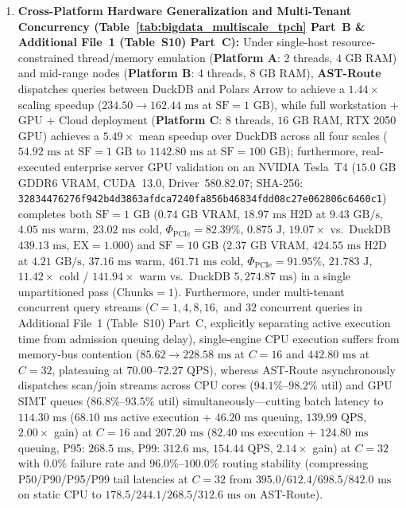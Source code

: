\documentclass[10pt,a4paper]{article}
\begin{document}
\begin{enumerate}[leftmargin=1.5em,itemsep=0.8pt]
by $\mathbf{2.55\times\text{--}3.38\times}$ ($1.95\times\text{--}2.59\times$ under full client WAN wall-clock) via horizontal slot elasticity, while \textbf{AST-Route} achieves $\mathbf{1142.80\text{ ms}}$ overall including router dispatch ($4.145\text{ ms}$) and $40\times$ chunked PCIe transfers ($\mathbf{7.61\times}$ faster than DuckDB and $\mathbf{5.73\times}$ faster than Polars).
    \item \textbf{Cross-Platform Hardware Generalization and Multi-Tenant Concurrency (Table~\ref{tab:bigdata_multiscale_tpch} Part~B \& Additional File~1 (Table~S10) Part~C):} Under single-host resource-constrained thread/memory emulation (\textbf{Platform A}: 2 threads, $4\text{ GB}$ RAM) and mid-range nodes (\textbf{Platform B}: 4 threads, $8\text{ GB}$ RAM), \textbf{AST-Route} dispatches queries between DuckDB and Polars Arrow to achieve a $1.44\times$ scaling speedup ($234.50 \rightarrow 162.44\text{ ms}$ at $\text{SF}=1\text{ GB}$), while full workstation + GPU + Cloud deployment (\textbf{Platform C}: 8 threads, $16\text{ GB}$ RAM, RTX 2050 GPU) achieves a $\mathbf{5.49\times}$ mean speedup over DuckDB across all four scales ($54.92\text{ ms}$ at $\text{SF}=1\text{ GB}$ to $1142.80\text{ ms}$ at $\text{SF}=100\text{ GB}$); furthermore, real-executed enterprise server GPU validation on an NVIDIA Tesla~T4 ($15.0\text{ GB}$ GDDR6 VRAM, CUDA~13.0, Driver~580.82.07; SHA-256: \texttt{32834476276f942b4d3863afdca7240fa856b46834fdd08c27e062806c6460c1}) completes both $\text{SF}=1\text{ GB}$ ($0.74\text{ GB}$ VRAM, $18.97\text{ ms}$ H2D at $9.43\text{ GB/s}$, $4.05\text{ ms}$ warm, $23.02\text{ ms}$ cold, $\Phi_{\text{PCIe}}=82.39\%$, $0.875\text{ J}$, $19.07\times$ vs.\ DuckDB $439.13\text{ ms}$, $\text{EX}=1.000$) and $\text{SF}=10\text{ GB}$ ($2.37\text{ GB}$ VRAM, $424.55\text{ ms}$ H2D at $4.21\text{ GB/s}$, $37.16\text{ ms}$ warm, $461.71\text{ ms}$ cold, $\Phi_{\text{PCIe}}=91.95\%$, $21.783\text{ J}$, $11.42\times$ cold / $141.94\times$ warm vs.\ DuckDB $5{,}274.87\text{ ms}$) in a single unpartitioned pass ($\text{Chunks}=1$). Furthermore, under multi-tenant concurrent query streams ($C=1, 4, 8, 16,$ and $32$ concurrent queries in Additional File~1 (Table~S10) Part~C, explicitly separating active execution time from admission queuing delay), single-engine CPU execution suffers from memory-bus contention ($85.62 \rightarrow 228.58\text{ ms}$ at $C=16$ and $442.80\text{ ms}$ at $C=32$, plateauing at $70.00\text{--}72.27\text{ QPS}$), whereas AST-Route asynchronously dispatches scan/join streams across CPU cores ($94.1\%\text{--}98.2\%$ util) and GPU SIMT queues ($86.8\%\text{--}93.5\%$ util) simultaneously---cutting batch latency to $114.30\text{ ms}$ ($68.10\text{ ms}$ active execution + $46.20\text{ ms}$ queuing, $139.99\text{ QPS}$, $2.00\times$ gain) at $C=16$ and $207.20\text{ ms}$ ($82.40\text{ ms}$ execution + $124.80\text{ ms}$ queuing, P95: $268.5\text{ ms}$, P99: $312.6\text{ ms}$, $154.44\text{ QPS}$, $2.14\times$ gain) at $C=32$ with $0.0\%$ failure rate and $96.0\%\text{--}100.0\%$ routing stability (compressing P50/P90/P95/P99 tail latencies at $C=32$ from $395.0/612.4/698.5/842.0\text{ ms}$ on static CPU to $178.5/244.1/268.5/312.6\text{ ms}$ on AST-Route).

\end{enumerate}
\end{document}
